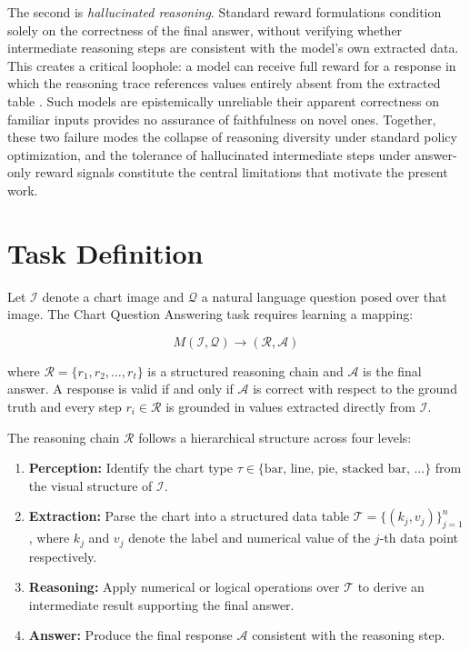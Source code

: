 \documentclass{iutbscthesis}
\begin{document}
The second is \textit{hallucinated reasoning}. Standard reward formulations condition solely on the correctness of the final answer, without verifying whether intermediate reasoning steps are consistent with the model's own extracted data. This creates a critical loophole: a model can receive full reward for a response in which the reasoning trace references values entirely absent from the extracted table \cite{wen2025rlvr}. Such models are epistemically unreliable their apparent correctness on familiar inputs provides no assurance of faithfulness on novel ones.
Together, these two failure modes the collapse of reasoning diversity under standard policy optimization, and the tolerance of hallucinated intermediate steps under answer-only reward signals constitute the central limitations that motivate the present work.

\section{Task Definition}

Let $\mathcal{I}$ denote a chart image and $\mathcal{Q}$ a natural language question posed over that image. The Chart Question Answering task requires learning a mapping:

\begin{equation}
    M(\mathcal{I}, \mathcal{Q}) \rightarrow (\mathcal{R}, \mathcal{A})
\end{equation}

\noindent where $\mathcal{R} = \{r_1, r_2, \ldots, r_t\}$ is a structured reasoning chain and $\mathcal{A}$ is the final answer. A response is valid if and only if $\mathcal{A}$ is correct with respect to the ground truth and every step $r_i \in \mathcal{R}$ is grounded in values extracted directly from $\mathcal{I}$.

The reasoning chain $\mathcal{R}$ follows a hierarchical structure across four levels:

\begin{enumerate}
    \item \textbf{Perception:} Identify the chart type $\tau \in \{\text{bar, line, pie, stacked bar, ...}\}$ from the visual structure of $\mathcal{I}$.
    \item \textbf{Extraction:} Parse the chart into a structured data table $\mathcal{T} = \{(k_j, v_j)\}_{j=1}^{n}$, where $k_j$ and $v_j$ denote the label and numerical value of the $j$-th data point respectively.
    \item \textbf{Reasoning:} Apply numerical or logical operations over $\mathcal{T}$ to derive an intermediate result supporting the final answer.
    \item \textbf{Answer:} Produce the final response $\mathcal{A}$ consistent with the reasoning step.
\end{enumerate}
\end{document}
